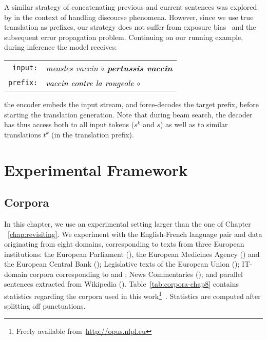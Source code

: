 A similar strategy of concatenating previous and current sentences was explored by \citet{tiedemann17neural} in the context of handling discourse phenomena.
However, since we use true translation as prefixes, our strategy does not suffer from exposure bias~\cite{Ranzato15sequence} and the subsequent error propagation problem.
%
Continuing on our running example, during inference the model receives:
\begin{center}
\begin{tabular}{rl}
\texttt{input:} & \it measles vaccin $\circ$ {\bf pertussis vaccin} \\ 
\texttt{prefix:} & \it \textcolor{black}{vaccin contre la rougeole $\circ$} \\
\end{tabular}
\end{center}
\noindent the encoder embeds the input stream, and force-decodes the target prefix,  before starting the translation generation. Note that during beam search, the decoder has thus access both to all input tokens ($s^k$ and $s$) as well as to similar translations \textcolor{black}{$t^k$} (in the translation prefix). 
\section{Experimental Framework}
\label{sec:eperiments-chap8}

\subsection{Corpora}
\label{ssec:corpora-chap8}
In this chapter, we use an experimental setting larger than the one of Chapter ~\ref{chap:revisiting}. We experiment with the English-French language pair and data originating from eight domains, corresponding to texts from three European institutions: 
the European Parliament (), 
the European Medicines Agency () and
the European Central Bank ();
Legislative texts of the European Union ();
IT-domain corpora corresponding to  and ;
News Commentaries ();
and parallel sentences extracted from Wikipedia ().
%
Table~\ref{tab:corpora-chap8} contains statistics regarding the corpora used in this work\footnote{Freely available from~\url{http://opus.nlpl.eu}}~\citep{Tiedemann12parallel}. Statistics are computed after splitting off punctuations.

